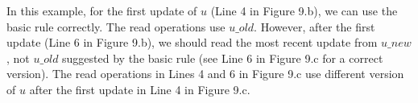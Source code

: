 In this example, %
for the first update of $u$ (Line 4 in Figure 9.b), we can 
use the basic rule correctly. The read operations use $u\_old$.
However, after the first update (Line 6 in Figure 9.b), we should read the most recent update from $u\_new$, not $u\_old$ suggested by the basic rule (see Line 6 in Figure 9.c for a correct version).
The read operations in Lines 4 and 6 in Figure 9.c use different version of $u$ after the first update in Line 4 in Figure 9.c. 
\begin{comment}
In naive dual version implementation, all $u$ which appears at the right hand side should be replaced with ${u_old}$ while $u$ at left hand side is ${u_new}$. The latter part is correct because whenever $u$ is written, there will be a status update with $u$. In Fig~\ref{fig:multi_updates} (b), $u$ experience two updates in single iteration. after first update, the status of according element has change, hence for second update, we need to read the new value of u instead of old value. For Fig~\ref{fig:multi_updates} (c), $update(u)$ is called call twice within single loop. The value of u is updated in first call, hence for second call of update, it should read new value of u. Therefore both two arguments passed to $update$ should be update version. These two cases remind us that when $u$ is read, it could be old value  or new value, hence we need to tracked the update status u within for-loop and across function call. 
\end{comment}

%
\lstset{style=style1}


